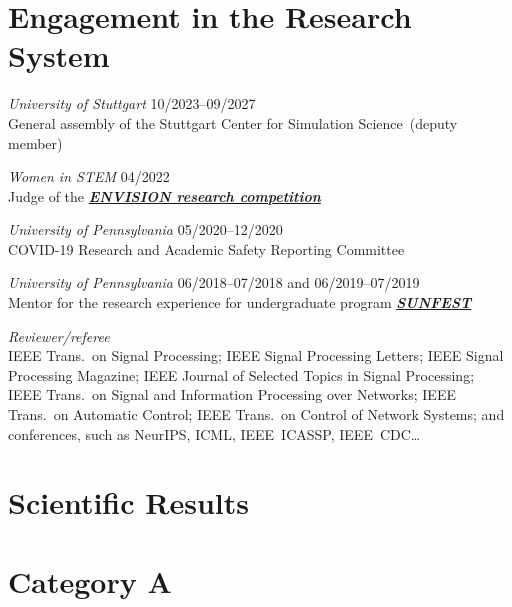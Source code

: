 \documentclass[a4paper,11pt]{article}
\begin{document}
\clearpage

\section*{Engagement in the Research System}


\emph{University of Stuttgart}
	\hfill 10/2023--09/2027
\\
General assembly of the Stuttgart Center for Simulation Science~(deputy member)
\medskip

\emph{Women in STEM}
	\hfill 04/2022
\\
Judge of the \href{http://envisionrc.com/}{\textbf{\emph{ENVISION research competition}}}
\medskip

\emph{University of Pennsylvania}
	\hfill 05/2020--12/2020
\\
COVID-19 Research and Academic Safety Reporting Committee

\emph{University of Pennsylvania}
	\hfill 06/2018--07/2018 and 06/2019--07/2019
\\
Mentor for the research experience for undergraduate program \href{https://sunfest.seas.upenn.edu}{\textbf{\emph{SUNFEST}}}
\medskip

\emph{Reviewer/referee}
\\
IEEE Trans.\ on Signal Processing; IEEE Signal Processing Letters; IEEE Signal Processing Magazine; IEEE Journal of Selected Topics in Signal Processing; IEEE Trans.\ on Signal and Information Processing over Networks; IEEE Trans.\ on Automatic Control; IEEE Trans.\ on Control of Network Systems; and conferences, such as NeurIPS, ICML, IEEE~ICASSP, IEEE~CDC\dots





\section*{Scientific Results}


\section*{Category A}
\end{document}
